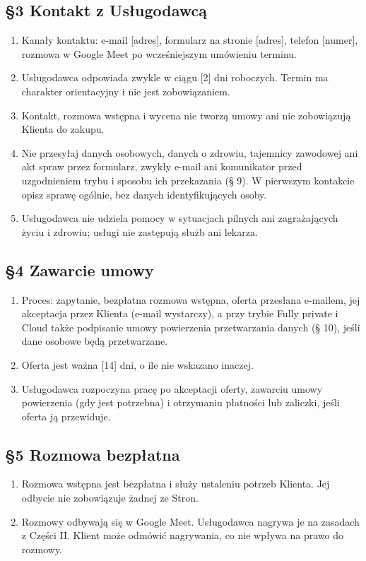 \documentclass[11pt,a4paper]{article}
\begin{document}
\subsection*{§3 Kontakt z Usługodawcą}
\begin{enumerate}
\item Kanały kontaktu: e-mail [adres], formularz na stronie [adres], telefon [numer], rozmowa w Google Meet po wcześniejszym umówieniu terminu.
\item Usługodawca odpowiada zwykle w ciągu [2] dni roboczych. Termin ma charakter orientacyjny i nie jest zobowiązaniem.
\item Kontakt, rozmowa wstępna i wycena nie tworzą umowy ani nie zobowiązują Klienta do zakupu.
\item Nie przesyłaj danych osobowych, danych o zdrowiu, tajemnicy zawodowej ani akt spraw przez formularz, zwykły e-mail ani komunikator przed uzgodnieniem trybu i sposobu ich przekazania (§ 9). W pierwszym kontakcie opisz sprawę ogólnie, bez danych identyfikujących osoby.
\item Usługodawca nie udziela pomocy w sytuacjach pilnych ani zagrażających życiu i zdrowiu; usługi nie zastępują służb ani lekarza.
\end{enumerate}

\subsection*{§4 Zawarcie umowy}
\begin{enumerate}
\item Proces: zapytanie, bezpłatna rozmowa wstępna, oferta przesłana e-mailem, jej akceptacja przez Klienta (e-mail wystarczy), a przy trybie Fully private i Cloud także podpisanie umowy powierzenia przetwarzania danych (§ 10), jeśli dane osobowe będą przetwarzane.
\item Oferta jest ważna [14] dni, o ile nie wskazano inaczej.
\item Usługodawca rozpoczyna pracę po akceptacji oferty, zawarciu umowy powierzenia (gdy jest potrzebna) i otrzymaniu płatności lub zaliczki, jeśli oferta ją przewiduje.
\end{enumerate}

\subsection*{§5 Rozmowa bezpłatna}
\begin{enumerate}
\item Rozmowa wstępna jest bezpłatna i służy ustaleniu potrzeb Klienta. Jej odbycie nie zobowiązuje żadnej ze Stron.
\item Rozmowy odbywają się w Google Meet. Usługodawca nagrywa je na zasadach z Części II. Klient może odmówić nagrywania, co nie wpływa na prawo do rozmowy.
\end{enumerate}
\end{document}
